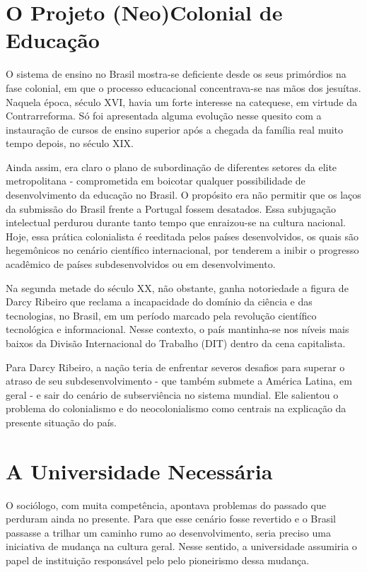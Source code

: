 \documentclass{sbrt}
\begin{document}
\section{O Projeto (Neo)Colonial de Educação}

O sistema de ensino no Brasil mostra-se deficiente desde os seus primórdios na fase colonial, em que o processo educacional concentrava-se nas mãos dos jesuítas. Naquela época, século XVI, havia um forte interesse na catequese, em virtude da Contrarreforma. Só foi apresentada alguma evolução nesse quesito com a instauração de cursos de ensino superior após a chegada da família real muito tempo depois, no século XIX.

Ainda assim, era claro o plano de subordinação de diferentes setores da elite metropolitana - comprometida em boicotar qualquer possibilidade de desenvolvimento da educação no Brasil. O propósito era não permitir que os laços da submissão do Brasil frente a Portugal fossem desatados. Essa subjugação intelectual perdurou durante tanto tempo que enraizou-se na cultura nacional. Hoje, essa prática colonialista é reeditada pelos países desenvolvidos, os quais são hegemônicos no cenário científico internacional, por tenderem a inibir o progresso acadêmico de países subdesenvolvidos ou em desenvolvimento.

Na segunda metade do século XX, não obstante, ganha notoriedade a figura de Darcy Ribeiro que reclama a incapacidade do domínio da ciência e das tecnologias, no Brasil, em um período marcado pela revolução científico tecnológica e informacional. Nesse contexto, o país mantinha-se nos níveis mais baixos da Divisão Internacional do Trabalho (DIT) dentro da cena capitalista.

Para Darcy Ribeiro, a nação teria de enfrentar severos desafios para superar o atraso de seu subdesenvolvimento - que também submete a América Latina, em geral - e sair do cenário de subserviência no sistema mundial. Ele salientou o problema do colonialismo e do neocolonialismo como centrais na explicação da presente situação do país.

\section{A Universidade Necessária}

O sociólogo, com muita competência, apontava problemas do passado que perduram ainda no presente. Para que esse cenário fosse revertido e o Brasil passasse a trilhar um caminho rumo ao desenvolvimento, seria preciso uma iniciativa de mudança na cultura geral. Nesse sentido, a universidade assumiria o papel de instituição responsável pelo pelo pioneirismo dessa mudança.
\end{document}
